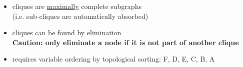 \begin{frame} \frametitle{\subsecname
}
					\slidesonly{\vspace{5mm}}
				\begin{itemize}
					\item cliques are \underline{maximally} complete subgraphs\\
					(i.e. sub-cliques are automatically absorbed)
					\item cliques can be found by elimination \\
					\slidesonly{\vspace{10mm}}
					\textbf{Caution: only eliminate a node if it is not part of another clique}
					\slidesonly{\vspace{5mm}}
					\item requires variable ordering by topological sorting: 
						F, D, E, C, B, A
				\end{itemize}
	
	
	

\end{frame}
